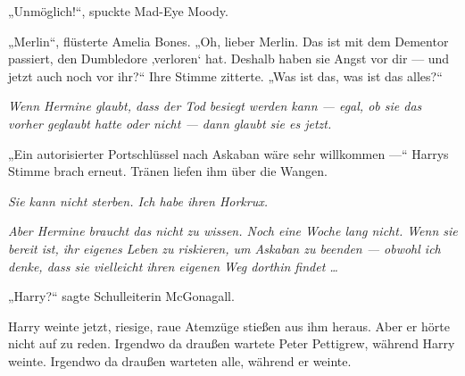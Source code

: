 „Unmöglich!“, spuckte Mad-Eye Moody.

„Merlin“, flüsterte Amelia Bones.
„Oh, lieber Merlin. Das ist mit dem Dementor passiert, den Dumbledore ‚verloren‘ hat. Deshalb haben sie Angst vor dir — und jetzt auch noch vor ihr?“
Ihre Stimme zitterte.
„Was ist das, was ist das alles?“

\emph{Wenn Hermine glaubt, dass der Tod besiegt werden kann — egal, ob sie das vorher geglaubt hatte oder nicht — dann glaubt sie es jetzt.}

„Ein autorisierter Portschlüssel nach Askaban wäre sehr willkommen —“
Harrys Stimme brach erneut. Tränen liefen ihm über die Wangen.

\emph{Sie kann nicht sterben. Ich habe ihren Horkrux.}



\emph{Aber Hermine braucht das nicht zu wissen. Noch eine Woche lang nicht. Wenn sie bereit ist, ihr eigenes Leben zu riskieren, um Askaban zu beenden — obwohl ich denke, dass sie vielleicht ihren eigenen Weg dorthin findet …}

„Harry?“ sagte Schulleiterin McGonagall.

Harry weinte jetzt, riesige, raue Atemzüge stießen aus ihm heraus. Aber er hörte nicht auf zu reden. Irgendwo da draußen wartete Peter Pettigrew, während Harry weinte. Irgendwo da draußen warteten alle, während er weinte.

